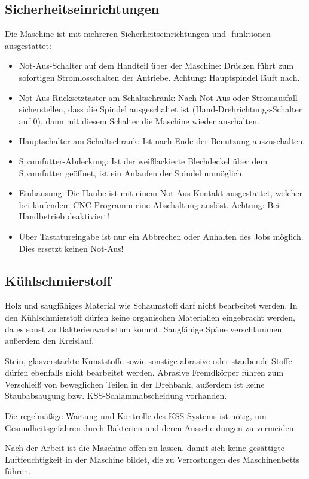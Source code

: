 \documentclass{\basedir/fablab-document}
\begin{document}
\subsection{Sicherheitseinrichtungen}
Die Maschine ist mit mehreren Sicherheitseinrichtungen und -funktionen ausgestattet:
\begin{itemize}
	\item Not-Aus-Schalter auf dem Handteil über der Maschine: Drücken führt zum sofortigen Stromlosschalten der Antriebe. Achtung: Hauptspindel läuft nach.
	\item Not-Aus-Rücksetztaster am Schaltschrank: Nach Not-Aus oder Stromausfall sicherstellen, dass die Spindel ausgeschaltet ist (Hand-Drehrichtungs-Schalter auf 0), dann mit diesem Schalter die Maschine wieder anschalten.
	\item Hauptschalter am Schaltschrank: Ist nach Ende der Benutzung auszuschalten.
	\item Spannfutter-Abdeckung: Ist der weißlackierte Blechdeckel über dem Spannfutter geöffnet, ist ein Anlaufen der Spindel unmöglich.
	\item Einhausung: Die Haube ist mit einem Not-Aus-Kontakt ausgestattet, welcher bei laufendem CNC-Programm eine Abschaltung auslöst. Achtung: Bei Handbetrieb deaktiviert!
	\item Über Tastatureingabe ist nur ein Abbrechen oder Anhalten des Jobs möglich. Dies ersetzt keinen Not-Aus!
\end{itemize}

\subsection{Kühlschmierstoff}

Holz und saugfähiges Material wie Schaumstoff darf nicht bearbeitet werden. In den Kühlschmierstoff dürfen keine organischen Materialien eingebracht werden, da es sonst zu Bakterienwachstum kommt. Saugfähige Späne verschlammen außerdem den Kreislauf.

Stein, glasverstärkte Kunststoffe sowie sonstige abrasive oder staubende Stoffe dürfen ebenfalls nicht bearbeitet werden. Abrasive Fremdkörper führen zum Verschleiß von beweglichen Teilen in der Drehbank, außerdem ist keine Staubabsaugung bzw. KSS-Schlammabscheidung vorhanden.

Die regelmäßige Wartung und Kontrolle des KSS-Systems ist nötig, um Gesundheitsgefahren durch Bakterien und deren Ausscheidungen zu vermeiden.

Nach der Arbeit ist die Maschine offen zu lassen, damit sich keine gesättigte Luftfeuchtigkeit in der Maschine bildet, die zu Verrostungen des Maschinenbetts führen.
\end{document}
